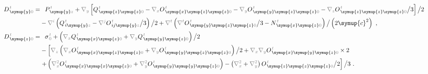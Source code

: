 \begin{subequations}
\begin{align}
	D^{\;\!\mathcolor{gray}{t}}_{\;\! \symup{y}\mathcolor{gray}{0}} = &\hphantom{+} P^{\;\!\mathcolor{gray}{t}}_{\;\! \symup{y}\mathcolor{gray}{z}} + \mathcolor{gray}{\nabla_y} \left[ Q^{\;\!\mathcolor{gray}{t}}_{\;\! \symup{z} \symup{z} \mathcolor{gray}{0}} - \mathcolor{gray}{\nabla_x} O^{\;\!\mathcolor{gray}{t}}_{\;\! \symup{x} \symup{z} \symup{z} \mathcolor{gray}{0}} - \mathcolor{gray}{\nabla_y}  O^{\;\!\mathcolor{gray}{t}}_{\;\! \symup{y} \symup{z} \symup{z} \mathcolor{gray}{0}} - \mathcolor{gray}{\nabla_z}  O^{\;\!\mathcolor{gray}{t}}_{\;\! \symup{z} \symup{z} \symup{z} \mathcolor{gray}{0}} \big/ 3 \right] \big/ 2 \label{eq:D_y0=} \\ &- \mathcolor{gray}{\nabla^i} \left( Q^{\;\!\mathcolor{gray}{t}}_{\;\! i\symup{y}\mathcolor{gray}{z}} - \mathcolor{gray}{\nabla^j} O^{\;\!\mathcolor{gray}{t}}_{\;\! ij\symup{y}\mathcolor{gray}{z}} \big/ 3 \right) \big/ 2 + \mathcolor{gray}{\nabla^t} \left( \mathcolor{gray}{\nabla^t} O^{\;\!\mathcolor{gray}{t}}_{\;\! \symup{y} \symup{z} \symup{z} \mathcolor{gray}{0}} \big/ 3 - N^{\;\!\mathcolor{gray}{t}}_{\;\! \symup{x} \symup{z} \mathcolor{gray}{0}} \right) \big/ \left( 2 \symup{c}^2 \right) ~, \\
	D^{\;\!\mathcolor{gray}{t}}_{\;\! \symup{z} \mathcolor{gray}{0}} = &\hphantom{+} {\sigma}^{\;\!\mathcolor{gray}{t}}_{\;\! \mathcolor{gray}{0}} + \left( \mathcolor{gray}{\nabla_x} Q^{\;\!\mathcolor{gray}{t}}_{\;\! \symup{x} \symup{z} \mathcolor{gray}{0}} + \mathcolor{gray}{\nabla_y} Q^{\;\!\mathcolor{gray}{t}}_{\;\! \symup{y} \symup{z} \mathcolor{gray}{0}} \right) \big/ 2 \label{eq:D_z0=} \\ & - \left[ \mathcolor{gray}{\nabla_z} \left( \mathcolor{gray}{\nabla_x} O^{\;\!\mathcolor{gray}{t}}_{\;\! \symup{x} \symup{z} \symup{z} \mathcolor{gray}{0}} + \mathcolor{gray}{\nabla_y} O^{\;\!\mathcolor{gray}{t}}_{\;\! \symup{y} \symup{z} \symup{z} \mathcolor{gray}{0}} \right) \big/ 2 + \mathcolor{gray}{\nabla_x} \mathcolor{gray}{\nabla_y} O^{\;\!\mathcolor{gray}{t}}_{\;\! \symup{x} \symup{y} \symup{z} \mathcolor{gray}{0}} \times 2 \right. \\ & \left. + \left( \mathcolor{gray}{\nabla_x^2} O^{\;\!\mathcolor{gray}{t}}_{\;\! \symup{x} \symup{x} \symup{z} \mathcolor{gray}{0}} + \mathcolor{gray}{\nabla_y^2} O^{\;\!\mathcolor{gray}{t}}_{\;\! \symup{y} \symup{y} \symup{z} \mathcolor{gray}{0}} \right) - \left( \mathcolor{gray}{\nabla_x^2} + \mathcolor{gray}{\nabla_y^2} \right) O^{\;\!\mathcolor{gray}{t}}_{\;\! \symup{z} \symup{z} \symup{z} \mathcolor{gray}{0}} \big/ 2 \right] \big/ 3 ~.
\end{align}
\end{subequations}
